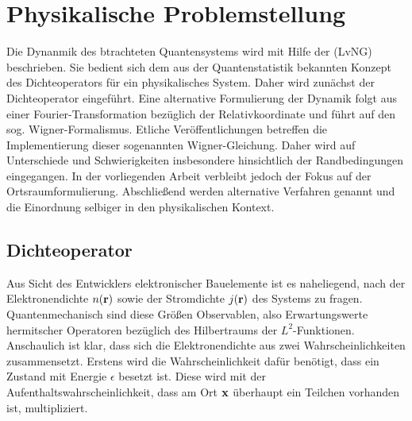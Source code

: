 \chapter{Physikalische Problemstellung}

Die Dynanmik des btrachteten Quantensystems wird mit Hilfe der \lvn (LvNG) beschrieben. Sie bedient sich dem aus der Quantenstatistik bekannten Konzept des Dichteoperators für ein physikalisches System. Daher wird zunächst der Dichteoperator  eingeführt. Eine alternative Formulierung der Dynamik folgt aus einer Fourier-Transformation bezüglich der Relativkoordinate und führt auf den sog. Wigner-Formalismus. Etliche Veröffentlichungen betreffen die Implementierung dieser sogenannten Wigner-Gleichung. Daher wird auf Unterschiede und Schwierigkeiten insbesondere hinsichtlich der Randbedingungen eingegangen. In der vorliegenden Arbeit verbleibt jedoch der Fokus auf der Ortsraumformulierung. Abschließend werden alternative Verfahren genannt und die Einordnung selbiger in den physikalischen Kontext.

\section{Dichteoperator} 
\label{sec:2_1}
Aus Sicht des Entwicklers elektronischer Bauelemente ist es naheliegend, nach der Elektronendichte $n(\vb{r})$ sowie der Stromdichte $j(\vb{r})$ des Systems zu fragen. Quantenmechanisch sind diese Größen Observablen, also Erwartungswerte hermitscher Operatoren bezüglich des Hilbertraums der $L^2$-Funktionen. Anschaulich ist klar, dass sich die Elektronendichte aus zwei Wahrscheinlichkeiten zusammensetzt. Erstens wird die Wahrscheinlichkeit dafür benötigt, dass ein Zustand mit Energie $\epsilon$ besetzt ist. Diese wird mit der Aufenthaltswahrscheinlichkeit, dass am Ort $\vb{x}$ überhaupt ein Teilchen vorhanden ist, multipliziert.

